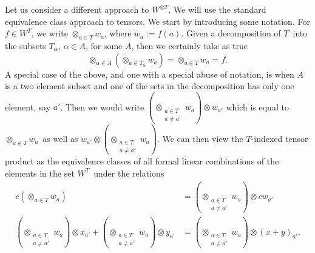 \documentclass[11pt]{article}
\theoremstyle{remark}
\begin{document}
Let us consider a different approach to \ensuremath{{\ensuremath{W}}^{{\otimes}{\ensuremath{T}}}}. We will use the
standard equivalence class approach to tensors. We start by
introducing some notation. For $f \in \ensuremath{{\ensuremath{W}}^{\ensuremath{T}}}$, we write
\ensuremath{\mathop{\otimes}_{\ensuremath{a} \in \ensuremath{T}} \ensuremath{w}_{\ensuremath{a}} }, where $\ensuremath{w}_{\ensuremath{a}} \ensuremath{:=} f(\ensuremath{a})$. 
Given a decomposition of \ensuremath{T}\ into the subsets $\ensuremath{T}_{\alpha}$, $\alpha
\in A$, for some $A$, 
then we
certainly take as true 
 \[\mathop{\otimes}_{\alpha \in A} (\mathop{\otimes}_{\ensuremath{a} \in
\ensuremath{T}_{\alpha}} \ensuremath{w}_{\ensuremath{a}})
= \ensuremath{\mathop{\otimes}_{\ensuremath{a} \in \ensuremath{T}} \ensuremath{w}_{\ensuremath{a}} } = f.
\]
A special case of the above, and one with a special abuse of notation,
is when $A$ is a two element subset and one of the sets in the
decomposition has only one element, say $\ensuremath{a}'$. Then we would write 
\ensuremath{(\mathop{\otimes}_{ \substack{\ensuremath{a}
 \in \ensuremath{T} \\
 \ensuremath{a} \neq \ensuremath{a}'}} \ensuremath{w}_\ensuremath{a}) \otimes {{w_{\ensuremath{a}'}} }} which is equal to \ensuremath{\mathop{\otimes}_{\ensuremath{a} \in \ensuremath{T}} \ensuremath{w}_{\ensuremath{a}} }\ as well as
$w_{\ensuremath{a}'} \otimes (\mathop{\otimes}_{\substack{\ensuremath{a} \in
\ensuremath{T} \\ \ensuremath{a} \neq \ensuremath{a}'}} \ensuremath{w}_{\ensuremath{a}}) $.
We can then view the 
\ensuremath{T}-indexed tensor product as the equivalence classes of all formal
linear combinations of the elements in the set \ensuremath{{\ensuremath{W}}^{\ensuremath{T}}}\ under the
relations 
\begin{align*}
c(\ensuremath{\mathop{\otimes}_{\ensuremath{a} \in \ensuremath{T}} \ensuremath{w}_{\ensuremath{a}} }) &= \ensuremath{(\mathop{\otimes}_{ \substack{\ensuremath{a}
 \in \ensuremath{T} \\
 \ensuremath{a} \neq \ensuremath{a}'}} \ensuremath{w}_\ensuremath{a}) \otimes {{c\ensuremath{w}_{\ensuremath{a}'}} }} 
\\
\ensuremath{(\mathop{\otimes}_{ \substack{\ensuremath{a}
 \in \ensuremath{T} \\
 \ensuremath{a} \neq \ensuremath{a}'}} \ensuremath{w}_\ensuremath{a}) \otimes {{x_{\ensuremath{a}'}} }} + \ensuremath{(\mathop{\otimes}_{ \substack{\ensuremath{a}
 \in \ensuremath{T} \\
 \ensuremath{a} \neq \ensuremath{a}'}} \ensuremath{w}_\ensuremath{a}) \otimes {{y_{\ensuremath{a}'}} }} &= \ensuremath{(\mathop{\otimes}_{ \substack{\ensuremath{a}
 \in \ensuremath{T} \\
 \ensuremath{a} \neq \ensuremath{a}'}} \ensuremath{w}_\ensuremath{a}) \otimes {{(x
+y)_{\ensuremath{a}'}} }}.  
\end{align*}
\end{document}

